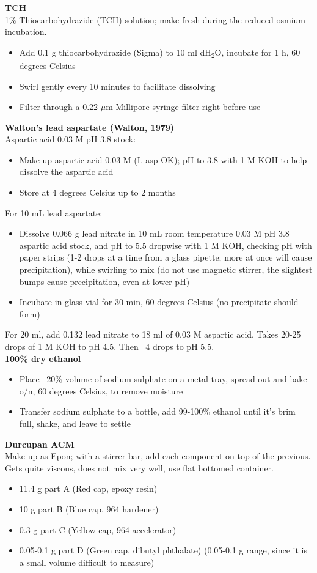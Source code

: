 \noindent
\textbf{TCH} \\
1\% Thiocarbohydrazide (TCH) solution; make fresh during the reduced osmium incubation.
\begin{itemize}
\item Add 0.1 g thiocarbohydrazide (Sigma) to 10 ml dH\textsubscript{2}O, incubate for 1 h, 60 degrees Celsius 
\item Swirl gently every 10 minutes to facilitate dissolving
\item Filter through a 0.22 $\mu$m Millipore syringe filter right before use
\end{itemize}

\noindent
\textbf{Walton’s lead aspartate (Walton, 1979)} \\
Aspartic acid 0.03 M pH 3.8 stock:
\begin{itemize}
\item Make up aspartic acid 0.03 M (L-asp OK); pH to 3.8 with 1 M KOH to help dissolve the aspartic acid
\item Store at 4 degrees Celsius up to 2 months
\end{itemize}
For 10 mL lead aspartate:
\begin{itemize}
\item Dissolve 0.066 g lead nitrate in 10 mL room temperature 0.03 M pH 3.8 aspartic acid stock, and pH to 5.5 dropwise with 1 M KOH, checking pH with paper strips (1-2 drops at a time from a glass pipette; more at once will cause precipitation), while swirling to mix (do not use magnetic stirrer, the slightest bumps cause precipitation, even at lower pH)
\item Incubate in glass vial for 30 min, 60 degrees Celsius (no precipitate should form)
\end{itemize}
For 20 ml, add 0.132 lead nitrate to 18 ml of 0.03 M aspartic acid. Takes 20-25 drops of 1 M KOH to pH 4.5. Then ~4 drops to pH 5.5. \\

\noindent
\textbf{100\% dry ethanol} 
\begin{itemize}
\item Place ~20\% volume of sodium sulphate on a metal tray, spread out and bake o/n, 60 degrees Celsius, to remove moisture
\item Transfer sodium sulphate to a bottle, add 99-100\% ethanol until it’s brim full, shake, and leave to settle
\end{itemize}

\noindent
\textbf{Durcupan ACM} \\
Make up as Epon; with a stirrer bar, add each component on top of the previous. Gets quite viscous, does not mix very well, use flat bottomed container.
\begin{itemize}
\item 11.4 g part A (Red cap, epoxy resin)
\item 10 g part B (Blue cap, 964 hardener)
\item 0.3 g part C (Yellow cap, 964 accelerator)
\item 0.05-0.1 g part D (Green cap, dibutyl phthalate) (0.05-0.1 g range, since it is a small volume difficult to measure)
\end{itemize}


